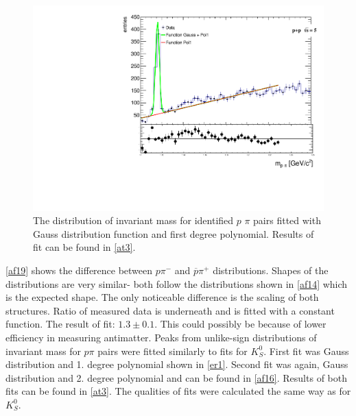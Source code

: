 \FloatBarrier
\begin{figure}[ht]
    \centering
    \includegraphics[width=1\textwidth]{figures/LambdaFitLinear.pdf}
    \caption[Distribution of invariant pion proton pairs fitted with Gauss distribution and 1. degree polynomial]{The distribution of invariant mass for identified $p$ $\pi$ pairs fitted with Gauss distribution function and first degree polynomial. Results of fit can be found in \autoref{at3}.}
    \label{af15}
\end{figure}
\FloatBarrier
\autoref{af19} shows the difference between $p \pi^-$ and $\overline{p} \pi^+$ distributions. Shapes of the distributions are very similar- both follow the distributions shown in \autoref{af14} which is the expected shape. The only noticeable difference is the scaling of both structures. Ratio of measured data is underneath and is fitted with a constant function. The result of fit: $1.3 \pm 0.1$. This could possibly be because of lower efficiency in measuring antimatter.
\newline
Peaks from unlike-sign distributions of invariant mass for $p \pi$ pairs were fitted similarly to fits for $K^0_S$. First fit was Gauss distribution and 1. degree polynomial shown in \autoref{er1}. Second fit was again, Gauss distribution and 2. degree polynomial and can be found in \autoref{af16}. Results of both fits can be found in \autoref{at3}. The qualities of fits were calculated the same way as for $K^0_S$. 
\FloatBarrier
